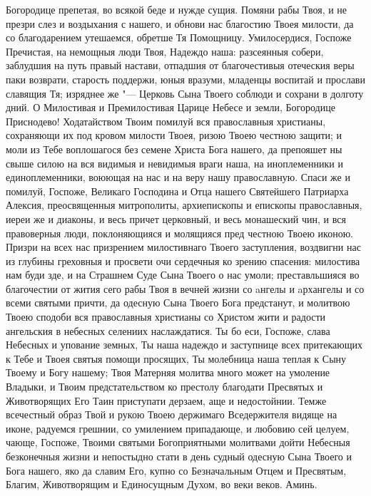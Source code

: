 Богородице препетая, во всякой беде и нужде сущия. Помяни рабы Твоя, и не презри слез и воздыхания с нашего, и обнови нас благостию Твоея милости, да со благодарением утешаемся, обретше Тя Помощницу. Умилосердися, Госпоже Пречистая, на немощныя люди Твоя, Надеждо наша: разсеянныя собери, заблудшия на путь правый настави, отпадшия от благочестивыя отеческия веры паки возврати, старость поддержи, юныя вразуми, младенцы воспитай и прослави славящия Тя; изряднее же "--- Церковь Сына Твоего соблюди и сохрани в долготу дний. О Милостивая и Премилостивая Царице Небесе и земли, Богородице Приснодево! Ходатайством Твоим помилуй вся православныя христианы, сохраняющи их под кровом милости Твоея, ризою Твоею честною защити; и моли из Тебе воплошагося без семене Христа Бога нашего, да препояшет ны свыше силою на вся видимыя и невидимыя враги наша, на иноплеменники и единоплеменники, воюющая на нас и на веру нашу православную. Спаси же и помилуй, Госпоже, Великаго Господина и Отца нашего Святейшего Патриарха Алексия, преосвященныя митрополиты, архиепископы и епископы православныя, иереи же и диаконы, и весь причет церковный, и весь монашеский чин, и вся правоверныя люди, поклоняющияся и молящияся пред честною Твоею иконою. Призри на всех нас призрением милостивнаго Твоего заступления, воздвигни нас из глубины греховныя и просвети очи сердечныя ко зрению спасения: милостива нам буди зде, и на Страшнем Суде Сына Твоего о нас умоли; преставльшияся во благочестии от жития сего рабы Твоя в вечней жизни со aнгелы и aрхангелы и со всеми святыми причти, да одесную Сына Твоего Бога предстанут, и молитвою Твоею сподоби вся православныя христианы со Христом жити и радости ангельския в небесных селениих наслаждатися. Ты бо еси, Госпоже, слава Небесных и упование земных, Ты наша надеждо и заступнице всех притекающих к Тебе и Твоея святыя помощи просящих, Ты молебница наша теплая к Сыну Твоему и Богу нашему; Твоя Матерняя молитва много может на умоление Владыки, и Твоим предстательством ко престолу благодати Пресвятых и Животворящих Его Таин приступати дерзаем, аще и недостойнии. Темже всечестный образ Твой и рукою Твоею держимаго Вседержителя видяще на иконе, радуемся грешнии, со умилением припадающе, и любовию сей целуем, чающе, Госпоже, Твоими святыми Богоприятными молитвами дойти Небесныя безконечныя жизни и непостыдно стати в день судный одесную Сына Твоего и Бога нашего, яко да славим Его, купно со Безначальным Отцем и Пресвятым, Благим, Животворящим и Единосущным Духом, во веки веков. Аминь.
\nopagebreak\bigskip\bigskip\mychapterending

